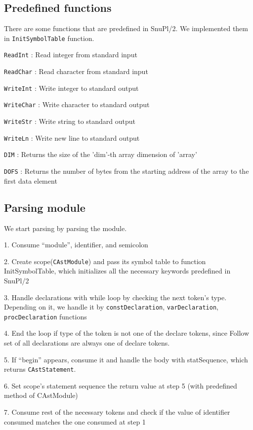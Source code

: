 \documentclass[12pt]{article}
\begin{document}
\subsection{Predefined functions}
There are some functions that are predefined in SnuPl/2. We implemented them in \texttt{InitSymbolTable} function.
\begin{MyIndentedList}
    \item \texttt{ReadInt} : Read integer from standard input
    \item \texttt{ReadChar} : Read character from standard input
    \item \texttt{WriteInt} : Write integer to standard output
    \item \texttt{WriteChar} : Write character to standard output
    \item \texttt{WriteStr} : Write string to standard output
    \item \texttt{WriteLn} : Write new line to standard output
    \item \texttt{DIM} : Returns the size of the 'dim'-th array dimension of 'array'
    \item \texttt{DOFS} : Returns the number of bytes from the starting address of the array to the first data element
\end{MyIndentedList}
\subsection{Parsing module}
\begin{MyIndentedList}
    \item We start parsing by parsing the module.
    \begin{MyIndentedList}
        \item 1. Consume “module”, identifier, and semicolon
        \item 2. Create scope(\texttt{CAstModule}) and pass its symbol table to function InitSymbolTable, which initializes all the necessary keywords predefined in SnuPl/2
        \item 3. Handle declarations with while loop by checking the next token’s type. Depending on it, we handle it by \texttt{constDeclaration}, \texttt{varDeclaration}, \texttt{procDeclaration} functions
        \item 4. End the loop if type of the token is not one of the declare tokens, since Follow set of all declarations are always one of declare tokens.
        \item 5.  If “begin” appears, consume it and handle the body with statSequence, which returns \texttt{CAstStatement}.
        \item 6. Set scope’s statement sequence the return value at step 5 (with predefined method of CAstModule)
        \item 7. Consume rest of the necessary tokens and check if the value of identifier consumed matches the one consumed at step 1                
    \end{MyIndentedList}
\end{MyIndentedList}
\end{document}
